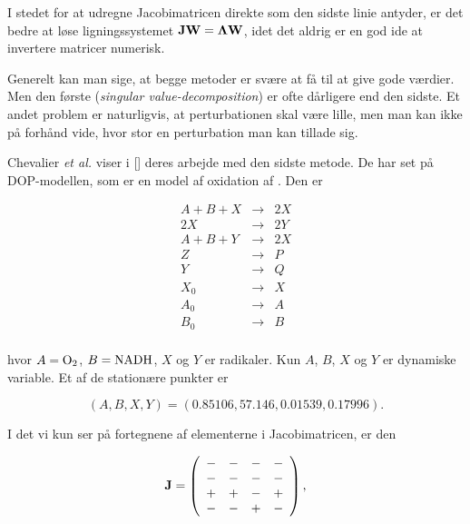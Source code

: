 I stedet for at udregne Jacobimatricen direkte som den
sidste linie antyder, er det bedre at l{\o}se ligningssystemet
$\mbox{${\bf J}$}\mbox{${\bf W}$}=\mbox{${\bf \Lambda}$}\mbox{${\bf W}$}$, idet det aldrig 
er en god ide at invertere matricer numerisk.

\vspace{4.0mm}
Generelt kan man sige, at begge metoder er sv{\ae}re at
f{\aa} til at give gode v{\ae}rdier. Men den f{\o}rste
({\em singular value-decomposition}) er ofte d{\aa}rligere
end den sidste. Et andet problem er naturligvis, at
perturbationen skal v{\ae}re lille, men man kan ikke p{\aa}
forh{\aa}nd vide, hvor stor en perturbation man kan tillade
sig.

\vspace{4.0mm}
Chevalier {\em et al.} viser i [] deres
arbejde med den sidste metode. De har set p{\aa}
DOP-modellen, som er en model af oxidation af .
Den er

\begin{eqnarray*}
A + B + X &\rightarrow& 2X \\
2X &\rightarrow& 2Y \\
A + B + Y &\rightarrow& 2X \\
Z &\rightarrow& P \\
Y &\rightarrow& Q \\
X_0 &\rightarrow& X \\
A_0 &\rightarrow& A \\
B_0 &\rightarrow& B \\
\end{eqnarray*}

hvor $A = \mbox{$\rm O_2$}$, $B=\mbox{$\rm NADH$}$, $X$ og $Y$ er
radikaler. Kun $A$, $B$, $X$ og $Y$ er dynamiske variable.
Et af de station{\ae}re punkter er 

\begin{equation}
(A,B,X,Y) = (0.85106, 57.146, 0.01539, 0.17996). 
\end{equation}

I det vi kun ser p{\aa} fortegnene af
elementerne i Jacobimatricen, er den

\[
  \mbox{${\bf J}$} = \left( 
  \begin{array}{cccc}
    - & - & - & - \\
    - & - & - & - \\
    + & + & - & + \\
    - & - & + & - \\
  \end{array}
  \right),
\]

